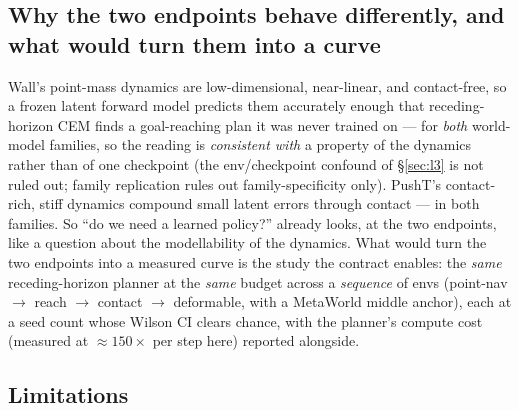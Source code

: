 \documentclass[10pt]{article}
\begin{document}
\subsection{Why the two endpoints behave differently, and what would
turn them into a curve}
Wall's point-mass dynamics are low-dimensional, near-linear, and
contact-free, so a frozen latent forward model predicts them accurately
enough that receding-horizon CEM finds a goal-reaching plan it was never
trained on --- for \emph{both} world-model families, so the reading is
\emph{consistent with} a property of the dynamics rather than of one
checkpoint (the env/checkpoint confound of \S\ref{sec:l3} is not ruled
out; family replication rules out family-specificity only). PushT's
contact-rich, stiff dynamics compound small latent errors through
contact --- in both families. So ``do we need a learned policy?''
already looks, at the two
endpoints, like a question about the modellability of the dynamics. What
would turn the two endpoints into a measured curve is the study the
contract enables: the \emph{same} receding-horizon planner at the
\emph{same} budget across a \emph{sequence} of envs (point-nav $\to$ reach
$\to$ contact $\to$ deformable, with a MetaWorld middle anchor), each at a
seed count whose Wilson CI clears chance, with the planner's compute cost
(measured at ${\approx}150\times$ per step here) reported alongside.

\subsection{Limitations}
\end{document}
